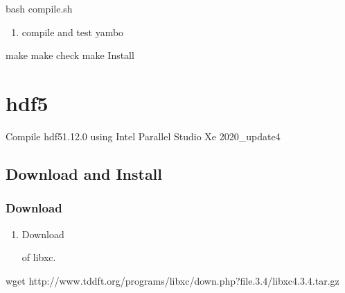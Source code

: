 \documentclass[a4paper,12pt,english]{sphinxmanual}
\begin{document}
\begin{sphinxVerbatim}[commandchars=\\\{\}]
bash compile.sh
\end{sphinxVerbatim}
\begin{enumerate}
%
\setcounter{enumi}{2}
\item {} 
\sphinxAtStartPar
compile and test yambo

\end{enumerate}

\begin{sphinxVerbatim}[commandchars=\\\{\}]
make  make check  make Install
\end{sphinxVerbatim}


\section{hdf5}
\label{\detokenize{compile:hdf5}}
\sphinxAtStartPar
Compile hdf5\sphinxhyphen{}1.12.0 using Intel Parallel Studio Xe 2020\_update4


\subsection{Download and Install}
\label{\detokenize{compile/hdf5_1.12.0:download-and-install}}\label{\detokenize{compile/hdf5_1.12.0::doc}}

\subsubsection{Download}
\label{\detokenize{compile/hdf5_1.12.0:download}}\begin{enumerate}
%
\item {} 
\sphinxAtStartPar
Download %
\begin{footnote}[3]\sphinxAtStartFootnote
{}
%
\end{footnote} of libxc.

\end{enumerate}

\begin{sphinxVerbatim}[commandchars=\\\{\}]
wget http://www.tddft.org/programs/libxc/down.php?file.3.4/libxc\PYGZhy{}4.3.4.tar.gz
\end{sphinxVerbatim}
\end{document}
